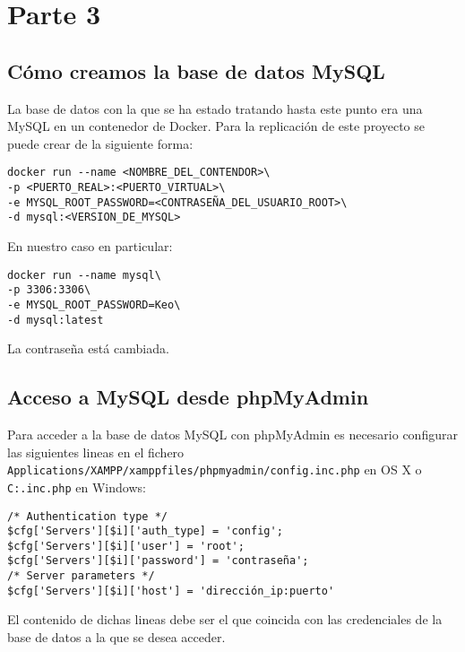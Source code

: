 \documentclass[a4paper, 11pt, oneside]{article} %
\begin{document}
\section{Parte 3}

\subsection{Cómo creamos la base de datos MySQL}

La base de datos con la que se ha estado tratando hasta este punto era una MySQL en un contenedor de Docker. Para la replicación de este proyecto se puede crear de la siguiente forma:

\begin{verbatim}
docker run --name <NOMBRE_DEL_CONTENDOR>\
-p <PUERTO_REAL>:<PUERTO_VIRTUAL>\
-e MYSQL_ROOT_PASSWORD=<CONTRASEÑA_DEL_USUARIO_ROOT>\
-d mysql:<VERSION_DE_MYSQL>
\end{verbatim}

En nuestro caso en particular:

\begin{verbatim}
docker run --name mysql\
-p 3306:3306\
-e MYSQL_ROOT_PASSWORD=Keo\
-d mysql:latest
\end{verbatim}

La contraseña está cambiada.




\subsection{Acceso a MySQL desde phpMyAdmin}

Para acceder a la base de datos MySQL con phpMyAdmin es necesario configurar las siguientes lineas en el fichero \texttt{Applications/XAMPP/xamppfiles/phpmyadmin/config.inc.php} en OS X o \texttt{C:\xampp\phpMyAdmin\config.inc.php} en Windows:

\begin{verbatim}
/* Authentication type */
$cfg['Servers'][$i]['auth_type] = 'config';
$cfg['Servers'][$i]['user'] = 'root';
$cfg['Servers'][$i]['password'] = 'contraseña';
/* Server parameters */
$cfg['Servers'][$i]['host'] = 'dirección_ip:puerto'
\end{verbatim}

El contenido de dichas lineas debe ser el que coincida con las credenciales de la base de datos a la que se desea acceder.
\end{document}
